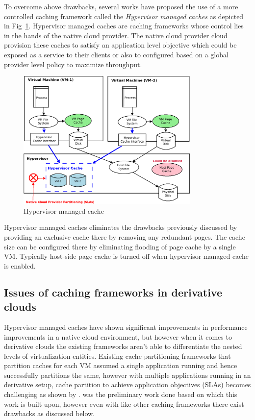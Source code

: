    To overcome above drawbacks, several works\cite{mishra2014comparative, koller2015centaur} have proposed the use of
    a more controlled caching framework called the \textit{Hypervisor managed caches} as depicted in Fig~\ref{img:hc}.  
    Hypervisor managed caches are caching frameworks whose control lies in the hands of the native cloud provider. 
    The native cloud provider cloud provision these caches to satisfy an application level objective which could be 
    exposed as a service to their clients or also to configured based on a global provider level policy to maximize 
    throughput.
    
      \begin{figure}
	\centering
	\includegraphics[width=0.8\textwidth]{images/intro/hc.png}
	\caption{Hypervisor managed cache}
	\label{img:hc}
      \end{figure}    
    
    Hypervisor managed caches eliminates the drawbacks previously discussed by providing an exclusive cache there by 
    removing any redundant pages. The cache size can be configured there by eliminating flooding of page cache by a single
    VM. Typically host-side page cache is turned off when hypervisor managed cache is enabled.
    
    \subsection{Issues of caching frameworks in derivative clouds}
      Hypervisor managed caches have shown significant improvements in performance improvements in a native cloud environment, 
      but however when it comes to derivative clouds the existing frameworks aren't able to differentiate the nested levels
      of virtualization entities. Existing cache partitioning frameworks\cite{koller2015centaur, stefanovici2015software}
      that partition caches for each VM assumed a single application running and hence successfully partitions the same, 
      however with multiple applications running in an derivative setup, cache partition to achieve application objectives 
      (SLAs) becomes challenging as shown by \dd{}\cite{doubledecker}. \dd{} was the preliminary work done based on which 
      this work is built upon, however even with \dd{} like other caching frameworks there exist drawbacks as discussed 
      below.
      
